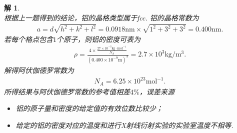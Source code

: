 \documentclass[UTF8,10pt,a4paper]{article}
\theoremstyle{Problem}
\theoremstyle{Solution}
\newtheorem*{sol}{解}
\begin{document}
\begin{sol}
\begin{table}[h]
    \end{table}
    \\根据上一题得到的结论，铝的晶格类型属于fcc. 铝的晶格常数为
    \begin{align}
        a=d\sqrt{h^2+k^2+l^2}=0.0918\text{nm}\times\sqrt{1^2+3^2+3^2}=0.400\text{nm}.
    \end{align}
    若每个格点包含$1$个原子，则铝的密度可表为
    \begin{align}
        \rho=\frac{4\times\frac{27\times 10^{-3}\text{kg}\cdot\text{mol}^{-1}}{N_A}}{(0.400\times 10^{-9}\text{m})^3}=2.7\times 10^3\text{kg}/\text{m}^3.
    \end{align}
    解得阿伏伽德罗常数为
    \begin{align}
        N_A=6.25\times 10^{23}\text{mol}^{-1}.
    \end{align}
    所得结果与阿伏伽德罗常数的参考值相差$4\%$，误差来源
    \begin{itemize}
        \item 铝的原子量和密度的给定值的有效位数比较少；
        \item 给定的铝的密度对应的温度和进行X射线衍射实验的实验室温度不相等.
    \end{itemize}
\end{sol}
\end{document}
